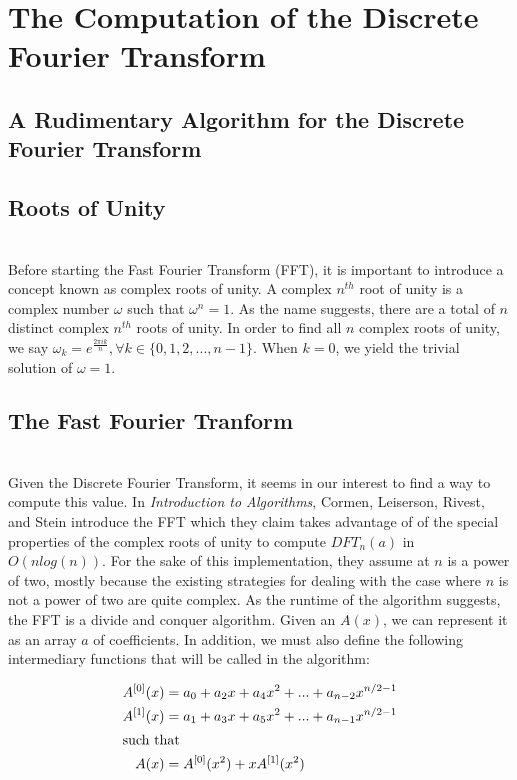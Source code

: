 \documentclass{amsproc}
\begin{document}
\section{The Computation of the Discrete Fourier Transform}

\subsection{A Rudimentary Algorithm for the Discrete Fourier Transform}

\subsection{Roots of Unity}

\mbox{}	 \\
\indent Before starting the Fast Fourier Transform (FFT), it is important to introduce a concept known as complex roots of unity. A complex $n^{th}$ root of unity is a complex number $\omega$ such that $\omega^n = 1$. As the name suggests, there are a total of $n$ distinct complex $n^{th}$ roots of unity. In order to find all $n$ complex roots of unity, we say $\omega_k = e^{\frac{2 \pi i k}{n}}, \forall k \in \{0, 1, 2, ... , n-1\}$. When $k = 0$, we yield the trivial solution of $\omega = 1$.


\subsection{The Fast Fourier Tranform}


\mbox{}	 \\
\indent Given the Discrete Fourier Transform, it seems in our interest to find a way to compute this value. In \textit{Introduction to Algorithms}, Cormen, Leiserson, Rivest, and Stein introduce the FFT which they claim takes advantage of of the special properties of the complex roots of unity to compute $DFT_n(a)$ in $O(nlog(n))$. For the sake of this implementation, they assume at $n$ is a power of two, mostly because the existing strategies for dealing with the case where $n$ is not a power of two are quite complex. As the runtime of the algorithm suggests, the FFT is a divide and conquer algorithm. Given an $A(x)$, we can represent it as an array $a$ of coefficients. In addition, we must also define the following intermediary functions that will be called in the algorithm:
	
\begin{align*}
A^{[0]}(x) &= a_0 + a_2x + a_4x^2 + ... + a_{n-2}x^{n/2 - 1} \\
A^{[1]}(x) &= a_1 + a_3x + a_5x^2 + ... + a_{n-1}x^{n/2 - 1} \\
\intertext{such that}
A(x) &= A^{[0]}(x^2) + xA^{[1]}(x^2)
\end{align*}
\end{document}
